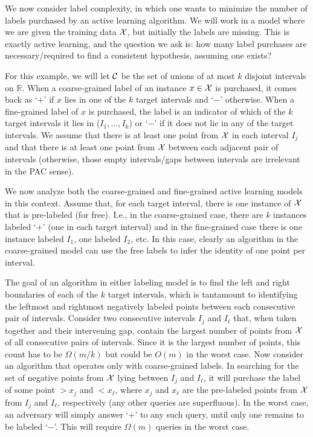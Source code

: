 We now consider label complexity, in which one wants to minimize the 
number of labels purchased by an active learning algorithm.
We will work in a model where we are given the training data $\cal X$, but initially
the labels are missing.  This is exactly active learning, and the question
we ask is: how many label purchases
are necessary/required to find a consistent hypothesis, assuming one exists? 

For this example, we will let $\cal C$ be the set  of unions of at
most $k$ disjoint intervals on $\mathbb{R}$. When a coarse-grained label
of an instance $x \in {\cal X}$ is purchased, it comes back as
`$+$' if $x$ lies in one of the $k$ target intervals and `$-$' otherwise.
When a fine-grained label of $x$ is purchased, the label is an indicator
of which of the $k$ target intervals it lies in ($I_1,\ldots,I_k$) or `$-$' if
it does not lie in any of the target intervals.  We assume that there is
at least one point from $\cal X$ in each interval $I_j$ and that there is
at least  one point from $\cal X$ between each adjacent pair of intervals
(otherwise, those empty intervals/gaps between intervals are irrelevant in
the PAC sense).

We now analyze both the coarse-grained and fine-grained active learning
models in this context. Assume that, for each target interval, there is
one instance of  $\cal X$ that is pre-labeled (for free).  I.e., in the 
coarse-grained case, there are $k$ instances labeled `$+$' (one in each target
interval) and in the fine-grained case there is one instance labeled $I_1$,
one labeled $I_2$, etc. In this case, clearly an algorithm in the coarse-grained
model can use the free labels to infer the identity of one point per interval.

The goal of an algorithm in either labeling model is to find the
left and right boundaries of each of the $k$ target intervals, which
is tantamount to identifying the leftmost and rightmost negatively
labeled points between each consecutive pair of intervals.  Consider
two consecutive intervals $I_j$ and $I_\ell$ that, when taken
together and their intervening gap, contain the largest number of
points from $\cal X$ of all consecutive pairs of intervals.  Since
it is the largest number of points, this count has to be $\Omega(m/k)$
but could be $O(m)$ in the worst case.  Now consider an algorithm
that operates only with coarse-grained labels.  In searching for
the set of negative points from $\cal X$ lying between $I_j$ and
$I_\ell$, it will purchase the label of some point $>x_j$ and
$<x_\ell$, where $x_j$ and $x_\ell$ are the pre-labeled points from
$\cal X$ from $I_j$ and $I_\ell$, respectively (any other queries
are superfluous).  In the worst case, an adversary will simply
answer `$+$' to any such query, until only one remains to be labeled
`$-$'.  This will require $\Omega(m)$ queries in the worst case.

